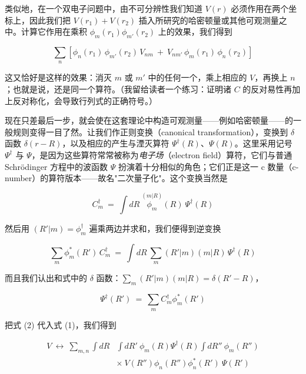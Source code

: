 类似地，在一个双电子问题中，由不可分辨性我们知道 $V(r)$ 必须作用在两个坐标上，因此我们把 $V(r_1)+V(r_2)$ 插入所研究的哈密顿量或其他可观测量之中。计算它作用在乘积 $\phi_m(r_1)\phi_{m'}(r_2)$ 上的效果，我们得到

\begin{equation*}
\sum_n\left[\phi_n(r_1)\,\phi_{m'}(r_2)\,V_{nm}\ +\ V_{nm'}\,\phi_m(r_1)\,\phi_n(r_2)\right]
\end{equation*}

这又恰好是这样的效果：消灭 $m$ 或 $m'$ 中的任何一个，乘上相应的 $V$，再换上 $n$；也就是说，还是同一个算符。（我留给读者一个练习：证明诸 $C$ 的反对易性再加上反对称化，会导致行列式的正确符号。）

现在只差最后一步，就会使在这套理论中构造可观测量——例如哈密顿量——的一般规则变得一目了然。让我们作正则变换（canonical transformation），变换到 $\delta$ 函数 $\delta(r-R)$，以及相应的产生与湮灭算符 $\Psi^{\dagger}(R)$、$\Psi(R)$。这里采用记号 $\Psi^{\dagger}$ 与 $\Psi$，是因为这些算符常常被称为\emph{电子场}（electron field）算符，它们与普通 Schrödinger 方程中的波函数 $\Psi$ 扮演着十分相似的角色；它们正是这一 c 数量（c-number）的算符版本——故名"二次量子化"。这个变换当然是

\begin{equation*}
C_m^{\dagger}\ =\ \int dR\ \overset{(m|R)}{\phi_m}(R)\ \Psi^{\dagger}(R)
\tag{2}
\end{equation*}

然后用 $(R'|m)=\phi_m^{\dagger}$ 遍乘两边并求和，我们便得到逆变换

\begin{equation*}
\sum_m \phi_m^{*}(R')\,C_m^{\dagger}\ =\ \int dR\ \sum_m (R'|m)(m|R)\,\Psi^{\dagger}(R)
\end{equation*}

而且我们认出和式中的 $\delta$ 函数：$\sum_m (R'|m)(m|R)=\delta(R'-R)$，

\begin{equation*}
\Psi^{\dagger}(R')\ =\ \sum_m C_m^{\dagger}\phi_m^{*}(R')
\tag{3}
\end{equation*}

把式 (2) 代入式 (1)，我们得到

\begin{align*}
V\ \longleftrightarrow\ \sum_{m,n}\int dR&\int dR'\ \phi_m(R)\Psi^{\dagger}(R)\int dR''\ \phi_m(R'')\\
&\times\ V(R'')\phi_n(R'')\phi_n^{*}(R')\ \Psi(R')
\end{align*}

